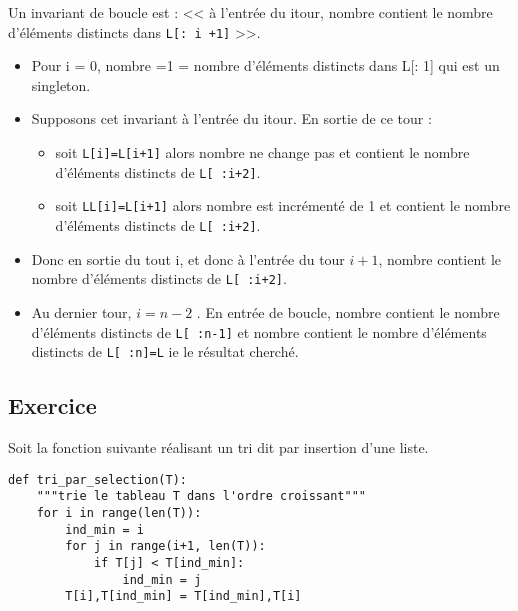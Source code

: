 



\ifprof
\begin{corrige}
Un invariant de boucle est :  << à l’entrée du i\ieme tour, nombre contient le nombre d’éléments distincts dans \texttt{L[: i +1]} >>.
\begin{itemize}
\item Pour i = 0, nombre =1 = nombre d’éléments distincts dans L[: 1] qui est un singleton.
\item Supposons cet invariant à l’entrée du i\ieme tour. En sortie de ce tour :
\begin{itemize}
\item soit \texttt{L[i]=L[i+1]} alors nombre ne change pas et contient le nombre d’éléments distincts de \texttt{L[ :i+2]}.
\item soit \texttt{LL[i]=L[i+1]} alors nombre est incrémenté de 1 et contient le nombre d’éléments distincts de \texttt{L[ :i+2]}.
\end{itemize}
\item Donc en sortie du tout i, et donc à l’entrée du tour $i +1$, nombre contient le nombre d’éléments distincts de \texttt{L[ :i+2]}.
\item Au dernier tour, $i = n - 2$ . En entrée de boucle, nombre contient le nombre d’éléments distincts de \texttt{L[ :n-1]} et
nombre contient le nombre d’éléments distincts de \texttt{L[ :n]=L} ie le résultat cherché.
\end{itemize}
\end{corrige}
\else
\fi

\subsection*{Exercice}

Soit la fonction suivante réalisant un tri dit par insertion d'une liste. 
\begin{lstlisting}
def tri_par_selection(T):
    """trie le tableau T dans l'ordre croissant"""
    for i in range(len(T)):
        ind_min = i
        for j in range(i+1, len(T)):
            if T[j] < T[ind_min]:
                ind_min = j
        T[i],T[ind_min] = T[ind_min],T[i]
\end{lstlisting}

